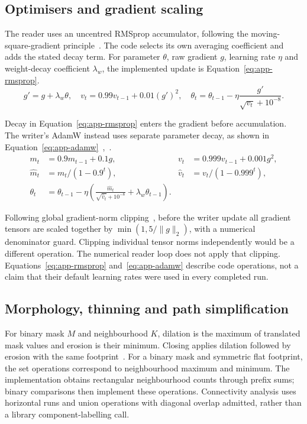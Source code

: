 \subsection{Optimisers and gradient scaling}
The reader uses an uncentred RMSprop accumulator, following the moving-square-gradient principle~\cite[p.~29]{tieleman2012}. The code selects its own averaging coefficient and adds the stated decay term. For parameter $\theta$, raw gradient $g$, learning rate $\eta$ and weight-decay coefficient $\lambda_w$, the implemented update is Equation~\ref{eq:app-rmsprop}.
\begin{equation}
g' =g+\lambda_w\theta,\quad
v_t=0.99v_{t-1}+0.01(g')^2,\quad
\theta_t=\theta_{t-1}-\eta\frac{g'}{\sqrt{v_t}+10^{-8}}.
\label{eq:app-rmsprop}
\end{equation}

Decay in Equation~\ref{eq:app-rmsprop} enters the gradient before accumulation. The writer's AdamW instead uses separate parameter decay, as shown in Equation~\ref{eq:app-adamw}~\cite[p.~2]{kingma2015},~\cite[p.~3]{loshchilov2019}.
\begin{equation}
\begin{aligned}
m_t&=0.9m_{t-1}+0.1g,& v_t&=0.999v_{t-1}+0.001g^2,\\
\widehat m_t&=m_t/(1-0.9^t),&\widehat v_t&=v_t/(1-0.999^t),\\
\theta_t&=\theta_{t-1}-\eta\left(\frac{\widehat m_t}{\sqrt{\widehat v_t}+10^{-8}}+\lambda_w\theta_{t-1}\right).
\end{aligned}
\label{eq:app-adamw}
\end{equation}

Following global gradient-norm clipping~\cite{pascanu2013}, before the writer update all gradient tensors are scaled together by $\min(1,5/\|g\|_2)$, with a numerical denominator guard. Clipping individual tensor norms independently would be a different operation. The numerical reader loop does not apply that clipping. Equations~\ref{eq:app-rmsprop} and~\ref{eq:app-adamw} describe code operations, not a claim that their default learning rates were used in every completed run.

\subsection{Morphology, thinning and path simplification}
For binary mask $M$ and neighbourhood $K$, dilation is the maximum of translated mask values and erosion is their minimum. Closing applies dilation followed by erosion with the same footprint~\cite[pp.~533, 541]{haralick1987}. For a binary mask and symmetric flat footprint, the set operations correspond to neighbourhood maximum and minimum. The implementation obtains rectangular neighbourhood counts through prefix sums; binary comparisons then implement these operations. Connectivity analysis uses horizontal runs and union operations with diagonal overlap admitted, rather than a library component-labelling call.

